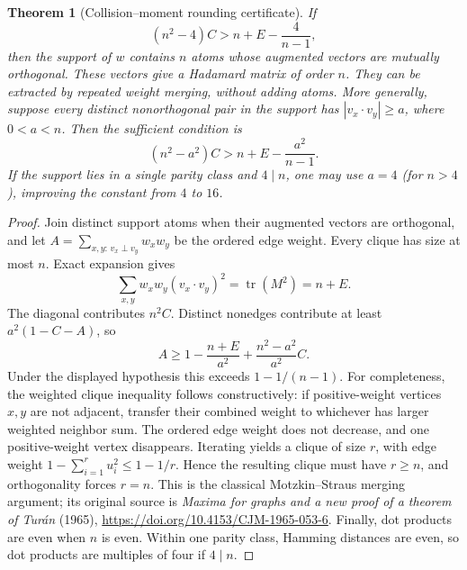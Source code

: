 \documentclass[11pt]{article}
\newtheorem{theorem}{Theorem}[section]
\newcommand{\tr}{\operatorname{tr}}
\begin{document}
\begin{theorem}[Collision--moment rounding certificate]
\label{thm:discrete-rounding}
If
\begin{equation}\label{eq:discrete-certificate}
 (n^2-4)C>n+E-\frac4{n-1},
\end{equation}
then the support of $w$ contains $n$ atoms whose augmented vectors are
mutually orthogonal. These vectors give a Hadamard matrix of order $n$.
They can be extracted by repeated weight merging, without adding atoms.
More generally, suppose every distinct nonorthogonal pair in the support
has $|v_x\cdot v_y|\ge a$, where $0<a<n$. Then the sufficient condition is
\[
 (n^2-a^2)C>n+E-\frac{a^2}{n-1}.
\]
If the support lies in a single parity class and $4\mid n$, one may
use $a=4$ (for $n>4$), improving the constant from $4$ to $16$.
\end{theorem}
\begin{proof}
Join distinct support atoms when their augmented vectors are orthogonal,
and let $A=\sum_{x,y:\,v_x\perp v_y}w_xw_y$ be the ordered edge weight.
Every clique has size at most $n$. Exact expansion gives
\[
 \sum_{x,y}w_xw_y(v_x\cdot v_y)^2=\tr(M^2)=n+E.
\]
The diagonal contributes $n^2C$. Distinct nonedges contribute at least
$a^2(1-C-A)$, so
\[
 A\ge1-\frac{n+E}{a^2}+\frac{n^2-a^2}{a^2}C.
\]
Under the displayed hypothesis this exceeds $1-1/(n-1)$.
For completeness, the weighted clique inequality follows constructively:
if positive-weight vertices $x,y$ are not adjacent, transfer their combined
weight to whichever has larger weighted neighbor sum. The ordered edge
weight does not decrease, and one positive-weight vertex disappears.
Iterating yields a clique of size $r$, with edge weight
$1-\sum_{i=1}^r u_i^2\le1-1/r$. Hence the resulting clique must have
$r\ge n$, and orthogonality forces $r=n$. This is the classical
Motzkin--Straus merging argument; its original source is
\emph{Maxima for graphs and a new proof of a theorem of Tur\'an}
(1965), \url{https://doi.org/10.4153/CJM-1965-053-6}.
Finally, dot products are even when $n$ is even. Within one parity class,
Hamming distances are even, so dot products are multiples of four if
$4\mid n$.
\end{proof}
\end{document}
